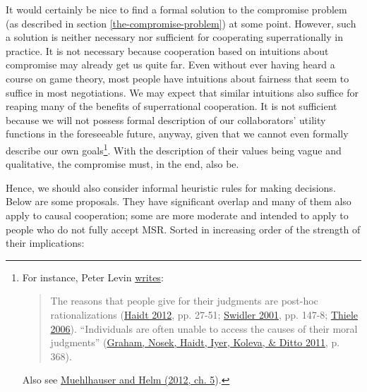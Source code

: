It would certainly be nice to find a formal solution to the compromise
problem (as described in section
\ref{the-compromise-problem}) at some point. However, such a solution is neither
necessary nor sufficient for cooperating superrationally in practice. It
is not necessary because cooperation based on intuitions about
compromise may already get us quite far. Even without ever having heard
a course on game theory, most people have intuitions about fairness that
seem to suffice in most negotiations. We may expect that similar
intuitions also suffice for reaping many of the benefits of
superrational cooperation. It is not sufficient because we will not
possess formal description of our collaborators' utility functions in
the foreseeable future, anyway, given that we cannot even formally
describe our own goals\footnote{\label{we-do-not-know-our-utility-function}
  For instance, Peter Levin
  \href{http://peterlevine.ws/?p=16998}{writes}:

  \begin{quote}
  The reasons that people give for their judgments are post-hoc
  rationalizations
  (\href{https://en.wikipedia.org/wiki/The_Righteous_Mind}{Haidt
  2012}, pp. 27-51;
  \href{https://en.wikipedia.org/wiki/Ann_Swidler\#Major_works}{Swidler
  2001}, pp. 147-8;
  \href{http://assets.cambridge.org/97805218/64442/frontmatter/9780521864442_frontmatter.pdf}{Thiele
  2006}). ``Individuals are often unable to access the causes of their
  moral judgments''
  (\href{http://citeseerx.ist.psu.edu/viewdoc/download?doi=10.1.1.704.8390\&rep=rep1\&type=pdf}{Graham,
  Nosek, Haidt, Iyer, Koleva, \& Ditto 2011}, p. 368).
  \end{quote}

  Also see
  \href{https://intelligence.org/files/IE-ME.pdf}{Muehlhauser and
  Helm (2012, ch. 5}).}. With the description of their values being
vague and qualitative, the compromise must, in the end, also be.

Hence, we should also consider informal heuristic rules for making
decisions. Below are some proposals. They have significant overlap and
many of them also apply to causal cooperation; some are more moderate
and intended to apply to people who do not fully accept MSR. Sorted in
increasing order of the strength of their implications:

